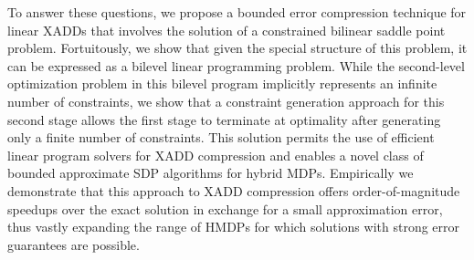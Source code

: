 To answer these questions, we propose a bounded error compression
technique for linear XADDs that involves the solution of a constrained
bilinear saddle point problem.  Fortuitously, we show that given the
special structure of this problem, it can be expressed as a bilevel
linear programming problem. %
While the second-level optimization problem in this
bilevel program implicitly represents an infinite number of
constraints, we show that a constraint generation approach for 
this second stage allows the first stage to terminate at
optimality after generating only a finite number of constraints.  This
solution permits the use of efficient linear program solvers for XADD
compression and enables a novel class of bounded approximate SDP
algorithms for hybrid MDPs.  Empirically we demonstrate that this
approach to XADD compression offers order-of-magnitude speedups over
the exact solution in exchange for a small approximation error, thus
vastly expanding the range of HMDPs for which solutions with strong
error guarantees are possible.

